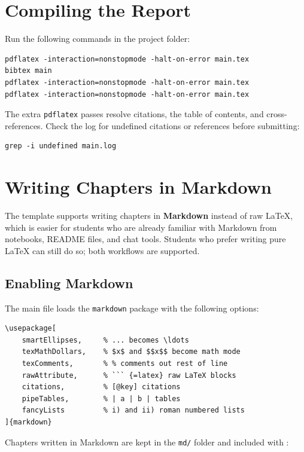 \section{Compiling the Report}

Run the following commands in the project folder:

\begin{verbatim}
pdflatex -interaction=nonstopmode -halt-on-error main.tex
bibtex main
pdflatex -interaction=nonstopmode -halt-on-error main.tex
pdflatex -interaction=nonstopmode -halt-on-error main.tex
\end{verbatim}

The extra \texttt{pdflatex} passes resolve citations, the table of contents, and cross-references. Check the log for undefined citations or references before submitting:

\begin{verbatim}
grep -i undefined main.log
\end{verbatim}

\section{Writing Chapters in Markdown}
\label{sec:markdown}

The template supports writing chapters in \textbf{Markdown} instead of raw \LaTeX{}, which is easier for students who are already familiar with Markdown from notebooks, README files, and chat tools. Students who prefer writing pure \LaTeX{} can still do so; both workflows are supported.

\subsection{Enabling Markdown}

The main file loads the \texttt{markdown} package with the following options:

\begin{verbatim}
\usepackage[
    smartEllipses,     % ... becomes \ldots
    texMathDollars,    % $x$ and $$x$$ become math mode
    texComments,       % % comments out rest of line
    rawAttribute,      % ``` {=latex} raw LaTeX blocks
    citations,         % [@key] citations
    pipeTables,        % | a | b | tables
    fancyLists         % i) and ii) roman numbered lists
]{markdown}
\end{verbatim}

Chapters written in Markdown are kept in the \texttt{md/} folder and included with \texttt{\string\markdownInput}:

